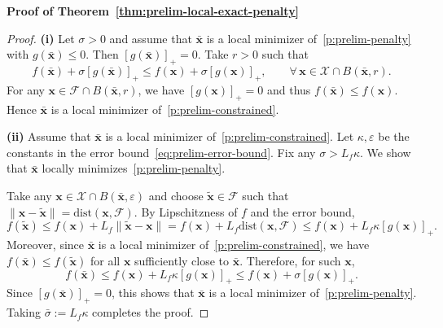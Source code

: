 \documentclass[11pt]{article}
\def\bs{\boldsymbol}
\def\dist{\mathrm{dist}}
\def\X{\mathcal{X}}
\begin{document}
\noindent\textbf{Proof of Theorem~\ref{thm:prelim-local-exact-penalty}}
\begin{proof}
\noindent\textbf{(i)} Let $\sigma>0$ and assume that $\bar{\bs{x}}$ is a local minimizer of~\eqref{p:prelim-penalty} with $g(\bar{\bs{x}})\le 0$.
Then $[g(\bar{\bs{x}})]_+=0$.
Take $r>0$ such that
\[
f(\bar{\bs{x}})+\sigma[g(\bar{\bs{x}})]_+
\le
f(\bs{x})+\sigma[g(\bs{x})]_+,
\qquad \forall\,\bs{x}\in \X\cap B(\bar{\bs{x}},r).
\]
For any $\bs{x}\in \mathcal{F}\cap B(\bar{\bs{x}},r)$, we have $[g(\bs{x})]_+=0$ and thus
$f(\bar{\bs{x}})\le f(\bs{x})$. Hence $\bar{\bs{x}}$ is a local minimizer of~\eqref{p:prelim-constrained}.

\medskip
\noindent\textbf{(ii)} Assume that $\bar{\bs{x}}$ is a local minimizer of~\eqref{p:prelim-constrained}.
Let $\kappa,\varepsilon$ be the constants in the error bound~\eqref{eq:prelim-error-bound}.
Fix any $\sigma>L_f\kappa$.
We show that $\bar{\bs{x}}$ locally minimizes~\eqref{p:prelim-penalty}.

Take any $\bs{x}\in \X\cap B(\bar{\bs{x}},\varepsilon)$ and choose $\tilde{\bs{x}}\in\mathcal{F}$ such that
$\|\bs{x}-\tilde{\bs{x}}\|=\dist(\bs{x},\mathcal{F})$.
By Lipschitzness of $f$ and the error bound,
\[
f(\tilde{\bs{x}})
\le
f(\bs{x})+L_f\|\tilde{\bs{x}}-\bs{x}\|
= f(\bs{x})+L_f\dist(\bs{x},\mathcal{F})
\le f(\bs{x})+L_f\kappa[g(\bs{x})]_+.
\]
Moreover, since $\bar{\bs{x}}$ is a local minimizer of~\eqref{p:prelim-constrained}, we have $f(\bar{\bs{x}})\le f(\tilde{\bs{x}})$ for all $\bs{x}$ sufficiently close to $\bar{\bs{x}}$.
Therefore, for such $\bs{x}$,
\[
f(\bar{\bs{x}})
\le
f(\bs{x})+L_f\kappa[g(\bs{x})]_+
\le
f(\bs{x})+\sigma[g(\bs{x})]_+.
\]
Since $[g(\bar{\bs{x}})]_+=0$, this shows that $\bar{\bs{x}}$ is a local minimizer of~\eqref{p:prelim-penalty}.
Taking $\bar\sigma:=L_f\kappa$ completes the proof.
\end{proof}
\end{document}
